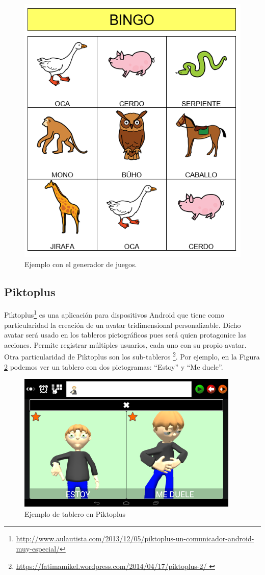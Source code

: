 \begin{itemize}
\begin{figure}[h!]
	\centering
	\includegraphics[width=0.7\linewidth]{Imagenes/Bitmap/juegoARASAAC}
	\caption{Ejemplo con el generador de juegos.}
	\label{fig:juegoarasaac}
\end{figure}



\end{itemize}

\subsection{Piktoplus}
\label{cap2:pkplus}
Piktoplus\footnote{\url{http://www.aulautista.com/2013/12/05/piktoplus-un-comunicador-android-muy-especial/}} es una aplicación para dispositivos Android que tiene como particularidad la creación de un avatar tridimensional personalizable. Dicho avatar será usado en los tableros pictográficos pues será quien protagonice las acciones. Permite registrar múltiples usuarios, cada uno con su propio avatar. Otra particularidad de Piktoplus son los sub-tableros \footnote{\url{https://fatimamikel.wordpress.com/2014/04/17/piktoplus-2/ }}. Por ejemplo, en la Figura \ref{fig:piktoplus1}  podemos ver un tablero con dos pictogramas: “Estoy” y “Me duele”.


\begin{figure}[h!]
	\centering
	\includegraphics[width=0.5\linewidth]{Imagenes/Bitmap/Piktoplus1}
	\caption[Pictoplus tablero]{Ejemplo de tablero en Piktoplus}
	\label{fig:piktoplus1}
\end{figure}

